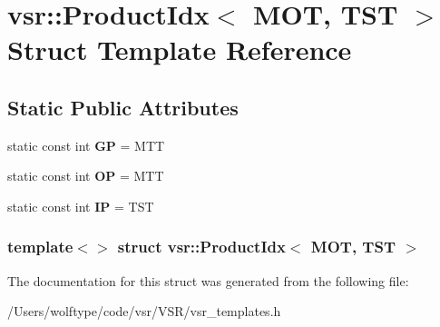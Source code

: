 \hypertarget{structvsr_1_1_product_idx_3_01_m_o_t_00_01_t_s_t_01_4}{\section{vsr\-:\-:Product\-Idx$<$ M\-O\-T, T\-S\-T $>$ Struct Template Reference}
\label{structvsr_1_1_product_idx_3_01_m_o_t_00_01_t_s_t_01_4}
}
\subsection*{Static Public Attributes}
\begin{DoxyCompactItemize}
\item 
\hypertarget{structvsr_1_1_product_idx_3_01_m_o_t_00_01_t_s_t_01_4_a63ff291d82216148450132a9e5a5488a}{static const int {\bfseries G\-P} = M\-T\-T}\label{structvsr_1_1_product_idx_3_01_m_o_t_00_01_t_s_t_01_4_a63ff291d82216148450132a9e5a5488a}

\item 
\hypertarget{structvsr_1_1_product_idx_3_01_m_o_t_00_01_t_s_t_01_4_aef1ee93efc5aa54c3228e025c4bd9691}{static const int {\bfseries O\-P} = M\-T\-T}\label{structvsr_1_1_product_idx_3_01_m_o_t_00_01_t_s_t_01_4_aef1ee93efc5aa54c3228e025c4bd9691}

\item 
\hypertarget{structvsr_1_1_product_idx_3_01_m_o_t_00_01_t_s_t_01_4_a95df19e42fde37cdcb797c15845bb7b9}{static const int {\bfseries I\-P} = T\-S\-T}\label{structvsr_1_1_product_idx_3_01_m_o_t_00_01_t_s_t_01_4_a95df19e42fde37cdcb797c15845bb7b9}

\end{DoxyCompactItemize}
\subsubsection*{template$<$$>$ struct vsr\-::\-Product\-Idx$<$ M\-O\-T, T\-S\-T $>$}



The documentation for this struct was generated from the following file\-:\begin{DoxyCompactItemize}
\item 
/\-Users/wolftype/code/vsr/\-V\-S\-R/vsr\-\_\-templates.\-h\end{DoxyCompactItemize}
